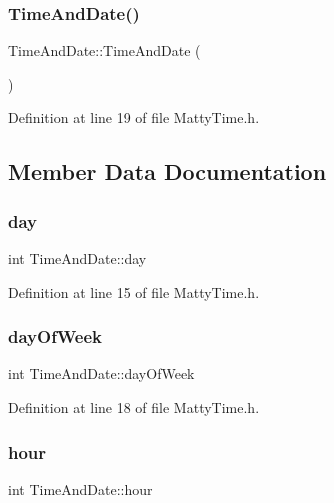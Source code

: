 \subsubsection{\texorpdfstring{Time\+And\+Date()}{TimeAndDate()}}
{\footnotesize\ttfamily Time\+And\+Date\+::\+Time\+And\+Date (\begin{DoxyParamCaption}{ }\end{DoxyParamCaption})\hspace{0.3cm}{\ttfamily [inline]}}



Definition at line 19 of file Matty\+Time.\+h.



\subsection{Member Data Documentation}
\hypertarget{structTimeAndDate_a418a9b58c704cd1c84b442bf708e7c82}{}\label{structTimeAndDate_a418a9b58c704cd1c84b442bf708e7c82} 
\subsubsection{\texorpdfstring{day}{day}}
{\footnotesize\ttfamily int Time\+And\+Date\+::day}



Definition at line 15 of file Matty\+Time.\+h.

\hypertarget{structTimeAndDate_a486bfad43c428c9f275e3e887cf8bc52}{}\label{structTimeAndDate_a486bfad43c428c9f275e3e887cf8bc52} 
\subsubsection{\texorpdfstring{day\+Of\+Week}{dayOfWeek}}
{\footnotesize\ttfamily int Time\+And\+Date\+::day\+Of\+Week}



Definition at line 18 of file Matty\+Time.\+h.

\hypertarget{structTimeAndDate_a4afb76db08eda1b5015ec0dd5dc1e3bb}{}\label{structTimeAndDate_a4afb76db08eda1b5015ec0dd5dc1e3bb} 
\subsubsection{\texorpdfstring{hour}{hour}}
{\footnotesize\ttfamily int Time\+And\+Date\+::hour}



